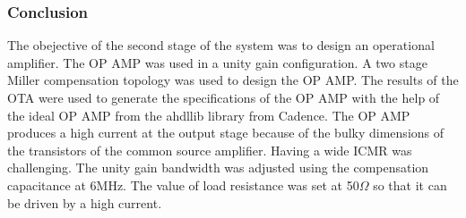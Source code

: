 \subsubsection{Conclusion}
The obejective of the second stage of the system was to design an operational amplifier. The OP AMP was used in a unity gain configuration. A two stage Miller compensation topology was used to design the OP AMP. The results of the OTA were used to generate the specifications of the OP AMP with the help of the ideal OP AMP from the ahdllib library from Cadence. The OP AMP produces a high current at the output stage because of the bulky dimensions of the transistors of the common source amplifier. Having a wide ICMR was challenging. The unity gain bandwidth was adjusted using the compensation capacitance at 6MHz. The value of load resistance was set at 50$\Omega$ so that it can be driven by a high current.